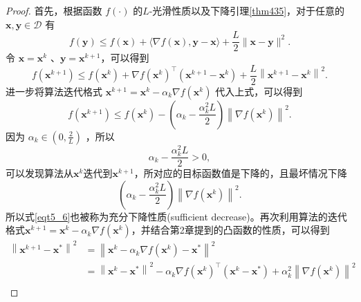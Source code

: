 \begin{proof}
    首先，根据函数 $f(\cdot)$ 的$L$-光滑性质以及下降引理\ref{thm435}，对于任意的 $\bm{x}, \bm{y} \in   \mathcal{D}$ 有
    \begin{equation}
        f(\bm{y}) \leq f(\bm{x})+\langle\nabla f(\bm{x}), \bm{y}-\bm{x}\rangle+\frac{L}{2}\|\bm{x}-\bm{y}\|^{2} .
        \nonumber 
    \end{equation}
    令 $\bm{x}=\bm{x}^{k}$ 、$\bm{y}=\bm{x}^{k+1}$，可以得到
    \begin{equation}
        f\left(\bm{x}^{k+1}\right) \leq f\left(\bm{x}^{k}\right)+\nabla f\left(\bm{x}^{k}\right)^{\top}\left(\bm{x}^{k+1}-\bm{x}^{k}\right)+\frac{L}{2}\left\|\bm{x}^{k+1}-\bm{x}^{k}\right\|^{2} .
        \nonumber
    \end{equation}
    进一步将算法迭代格式 $\bm{x}^{k+1}=\bm{x}^{k}-\alpha_{k} \nabla f\left(\bm{x}^{k}\right)$ 代入上式，可以得到
    \begin{equation}
        f\left(\bm{x}^{k+1}\right) \leq f\left(\bm{x}^{k}\right)-\left(\alpha_{k}-\frac{\alpha_{k}^{2} L}{2}\right)\left\|\nabla f\left(\bm{x}^{k}\right)\right\|^{2} .
        \label{eqt5_6}
    \end{equation}
    因为 $\alpha_{k} \in\left(0, \frac{2}{L}\right)$ ，所以
    \begin{equation}
        \alpha_{k}-\frac{\alpha_{k}^{2} L}{2}>0,
        \label{eqt107}
    \end{equation}
    可以发现算法从$\bm{x}^{k}$迭代到$\bm{x}^{k+1}$，所对应的目标函数值是下降的，且最坏情况下降
    \begin{equation}
        \left(\alpha_{k}-\frac{\alpha_{k}^{2} L}{2}\right)\left\|\nabla f\left(\bm{x}^{k}\right)\right\|^{2} .
        \nonumber
    \end{equation}
    所以式\ref{eqt5_6}也被称为充分下降性质(sufficient decrease)\cite{2009Accelerated}。再次利用算法的迭代格式$\bm{x}^{k+1}=\bm{x}^{k}-\alpha_{k} \nabla f\left(\bm{x}^{k}\right)$，并结合第2章提到的凸函数的性质，可以得到
    \begin{equation}
        \begin{split}
        \left\|\bm{x}^{k+1}-\bm{x}^{*}\right\|^{2} &=\left\|\bm{x}^{k}-\alpha_{k} \nabla f\left(\bm{x}^{k}\right)-\bm{x}^{*}\right\|^{2} \\
        &=\left\|\bm{x}^{k}-\bm{x}^{*}\right\|^{2}-\alpha_{k} \nabla f\left(\bm{x}^{k}\right)^{\top}\left(\bm{x}^{k}-\bm{x}^{*}\right)+\alpha_{k}^{2}\left\|\nabla f\left(\bm{x}^{k}\right)\right\|^{2} \\

\end{split}
\end{equation}
\end{proof}

